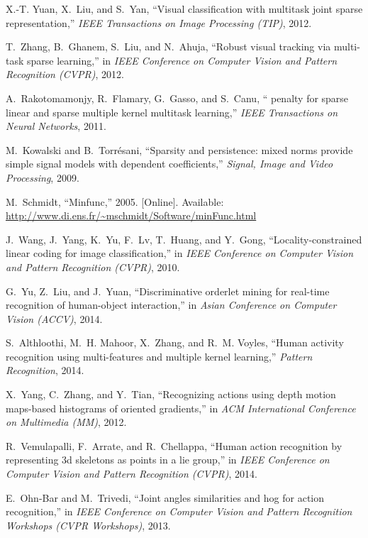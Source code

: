 \documentclass[9pt,technote,compsoc]{IEEEtran}
\begin{document}
\begin{thebibliography}{10}
	X.-T. Yuan, X.~Liu, and S.~Yan, ``Visual classification with multitask joint
	sparse representation,'' \emph{IEEE Transactions on Image Processing (TIP)},
	2012.
	
	T.~Zhang, B.~Ghanem, S.~Liu, and N.~Ahuja, ``Robust visual tracking via
	multi-task sparse learning,'' in \emph{IEEE Conference on Computer Vision and
		Pattern Recognition (CVPR)}, 2012.
	
	A.~Rakotomamonjy, R.~Flamary, G.~Gasso, and S.~Canu, `` penalty for
	sparse linear and sparse multiple kernel multitask learning,'' \emph{IEEE
		Transactions on Neural Networks}, 2011.
	
	M.~Kowalski and B.~Torrésani, ``Sparsity and persistence: mixed norms provide
	simple signal models with dependent coefficients,'' \emph{Signal, Image and
		Video Processing}, 2009.
	
	\BIBentryALTinterwordspacing
	M.~Schmidt, ``Minfunc,'' 2005. [Online]. Available:
	\url{http://www.di.ens.fr/~mschmidt/Software/minFunc.html}
	\BIBentrySTDinterwordspacing
	
	J.~Wang, J.~Yang, K.~Yu, F.~Lv, T.~Huang, and Y.~Gong, ``Locality-constrained
	linear coding for image classification,'' in \emph{IEEE Conference on
		Computer Vision and Pattern Recognition (CVPR)}, 2010.
	
	G.~Yu, Z.~Liu, and J.~Yuan, ``Discriminative orderlet mining for real-time
	recognition of human-object interaction,'' in \emph{Asian Conference on
		Computer Vision (ACCV)}, 2014.
	
	S.~Althloothi, M.~H. Mahoor, X.~Zhang, and R.~M. Voyles, ``Human activity
	recognition using multi-features and multiple kernel learning,''
	\emph{Pattern Recognition}, 2014.
	
	X.~Yang, C.~Zhang, and Y.~Tian, ``Recognizing actions using depth motion
	maps-based histograms of oriented gradients,'' in \emph{ACM International
		Conference on Multimedia (MM)}, 2012.
	
	R.~Vemulapalli, F.~Arrate, and R.~Chellappa, ``Human action recognition by
	representing 3d skeletons as points in a lie group,'' in \emph{IEEE
		Conference on Computer Vision and Pattern Recognition (CVPR)}, 2014.
	
	E.~Ohn-Bar and M.~Trivedi, ``Joint angles similarities and hog for action
	recognition,'' in \emph{IEEE Conference on Computer Vision and Pattern
		Recognition Workshops (CVPR Workshops)}, 2013.
	

\end{thebibliography}
\end{document}

